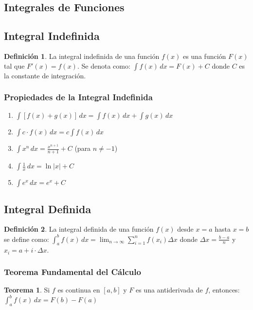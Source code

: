 \documentclass[12pt, a4paper, oneside]{book}
\theoremstyle{definition}
\newtheorem{definicion}{Definición}[chapter]
\newtheorem{teorema}{Teorema}[chapter]
\begin{document}
\subsection{Integrales de Funciones}

\subsection{Integral Indefinida}

\begin{definicion}
La integral indefinida de una función $f(x)$ es una función $F(x)$ tal que $F'(x) = f(x)$. Se denota como:
$\int f(x) \, dx = F(x) + C$
donde $C$ es la constante de integración.
\end{definicion}

\subsubsection{Propiedades de la Integral Indefinida}

\begin{enumerate}
    \item $\int [f(x) + g(x)] \, dx = \int f(x) \, dx + \int g(x) \, dx$
    \item $\int c \cdot f(x) \, dx = c \int f(x) \, dx$
    \item $\int x^n \, dx = \frac{x^{n+1}}{n+1} + C$ (para $n \neq -1$)
    \item $\int \frac{1}{x} \, dx = \ln|x| + C$
    \item $\int e^x \, dx = e^x + C$
\end{enumerate}

\subsection{Integral Definida}

\begin{definicion}
La integral definida de una función $f(x)$ desde $x = a$ hasta $x = b$ se define como:
$\int_a^b f(x) \, dx = \lim_{n \to \infty} \sum_{i=1}^n f(x_i) \Delta x$
donde $\Delta x = \frac{b-a}{n}$ y $x_i = a + i \cdot \Delta x$.
\end{definicion}

\subsubsection{Teorema Fundamental del Cálculo}

\begin{teorema}
Si $f$ es continua en $[a,b]$ y $F$ es una antiderivada de $f$, entonces:
$\int_a^b f(x) \, dx = F(b) - F(a)$
\end{teorema}
\end{document}
